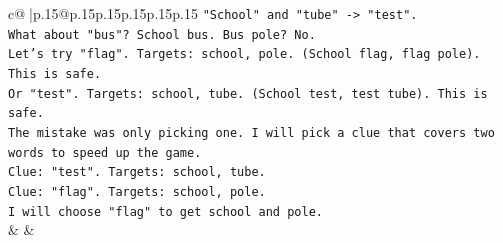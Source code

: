 \documentclass{article}
\begin{document}
{\begin{supertabular}{c@{$\;$}|p{.15\linewidth}@{}p{.15\linewidth}p{.15\linewidth}p{.15\linewidth}p{.15\linewidth}p{.15\linewidth}}
{{{\texttt{"School" and "tube" {-}> "test".} \\
\texttt{What about "bus"? School bus. Bus pole? No.} \\
\texttt{Let's try "flag". Targets: school, pole. (School flag, flag pole). This is safe.} \\
\texttt{Or "test". Targets: school, tube. (School test, test tube). This is safe.} \\
\texttt{The mistake was only picking one. I will pick a clue that covers two words to speed up the game.} \\
\texttt{Clue: "test". Targets: school, tube.} \\
\texttt{Clue: "flag". Targets: school, pole.} \\
\texttt{I will choose "flag" to get school and pole.} \\
            }
        }
    }
    & & \\ \\

\end{supertabular}
}
\end{document}
